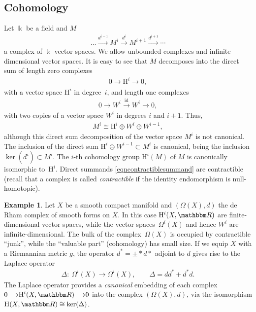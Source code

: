 \documentclass[10pt,a4paper]{amsart}
\theoremstyle{definition}
\newtheorem{Example}[thm]{Example}
\numberwithin{equation}{section}
\def\R{{\mathbbm R}}
\def\lra{{\longrightarrow}}
\newcommand{\mH}{\mathrm{H}} %
\begin{document}
\subsection{Cohomology}
Let $\Bbbk$ be a field and $M$
\begin{gather*} \dots \stackrel{d^{i-1}}{\lra} M^i \stackrel{d^i}{\lra} M^{i+1} \stackrel{d^{i+1}}{\lra} \cdots \end{gather*}
a complex of $\Bbbk$-vector spaces. We allow unbounded complexes and infinite-dimensional
vector spaces. It is easy to see that $M$ decomposes into
the direct sum of length zero complexes
\begin{gather*} %
0 \lra \mH^i \lra 0,
\end{gather*}
with a vector space $\mH^i$ in degree~$i$, and length one complexes
\begin{gather}\label{eqncontractiblesummand}
 0 \lra W^i \stackrel{\mathrm{id}}{\lra} W^i \lra 0,
\end{gather}
with two copies of a vector space $W^i$ in degrees $i$ and $i+1$. Thus,
 \begin{gather*} M^i \cong \mH^i \oplus W^i \oplus W^{i-1},\end{gather*}
although this direct sum decomposition of the vector space $M^i$ is not canonical. The
inclusion of the direct sum $\mH^i \oplus W^{i-1} \subset M^i$ is canonical, being
the inclusion $\operatorname{ker}(d^i) \subset M^i$.
The $i$-th cohomology group $\mH^i(M)$ of $M$ is canonically isomorphic to~$\mH^i$. Direct summands \eqref{eqncontractiblesummand} are contractible (recall that a complex is called \emph{contractible} if the identity endomorphism is null-homotopic).

\begin{Example}
Let $X$ be a smooth compact manifold and $(\Omega(X), d)$ the
de Rham complex of smooth forms on $X$. In this case $\mH^i(X,\R)$
are finite-dimensional vector spaces, while the vector spaces~$\Omega^i(X)$
and hence $W^i$ are infinite-dimensional. The bulk of the complex~$\Omega(X)$
is occupied by contractible ``junk'', while the ``valuable part'' (cohomology) has
small size.
If we equip $X$ with a Riemannian metric $g$, the operator $d^{\ast}=\pm \ast d\ast$
adjoint to $d$ gives rise to the Laplace operator
\begin{gather*}\Delta\colon \ \Omega^i(X) \lra \Omega^i(X), \qquad
\Delta= dd^{\ast} + d^{\ast} d.\end{gather*}
The Laplace operator provides a \emph{canonical} embedding of each complex
$ 0 \lra \mH^i(X,\R) \lra 0 $ into the complex $(\Omega(X), d)$, via the isomorphism
 $\mH(X,\R) \cong \operatorname{ker}(\Delta)$.
\end{Example}
\end{document}
